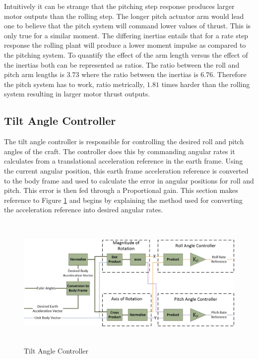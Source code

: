 		Intuitively it can be strange that the pitching step response produces larger motor outputs than the rolling step. The longer pitch actuator arm would lead one to believe that the pitch system will command lower values of thrust. This is only true for a similar moment. The differing inertias entails that for a rate step response the rolling plant will produce a lower moment impulse as compared to the pitching system. To quantify the effect of the arm length versus the effect of the inertias both can be represented as ratios. The ratio between the roll and pitch arm lengths is $3.73$ where the ratio between the inertias is $6.76$. Therefore the pitch system has to work, ratio metrically, $1.81$ times harder than the rolling system resulting in larger motor thrust outputs.
		
	\subsection{Tilt Angle Controller}
	The tilt angle controller is responsible for controlling the desired roll and pitch angles of the craft. The controller does this by commanding angular rates it calculates from a translational acceleration reference in the earth frame. Using the current angular position, this earth frame acceleration reference is converted to the body frame and used to calculate the error in angular positions for roll and pitch. This error is then fed through a Proportional gain. This section makes reference to Figure \ref{IM_TiltAngleController} and begins by explaining the method used for converting the acceleration reference into desired angular rates.
	
	\begin{figure}[H]
		\centering
		\includegraphics[height = 6.5cm]{../References/Diagrams/TiltAngleController.jpg}
		\caption{Tilt Angle Controller}
		\label{IM_TiltAngleController}
	\end{figure}
		
